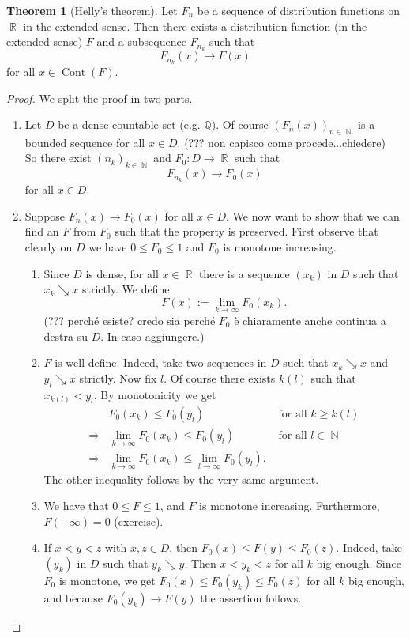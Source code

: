 \documentclass[12pt,a4paper]{report}
\theoremstyle{definition}
\newtheorem{theorem}{Theorem}[chapter] %
\theoremstyle{num.custom-title}
\DeclareMathOperator{\N}{\mathbb{N}}
\DeclareMathOperator{\R}{\mathbb{R}}
\DeclareMathOperator{\imp}{\Rightarrow}
\DeclareMathOperator{\Cont}{Cont}
\newcommand{\Q}{\mathbb{Q}}
\renewcommand{\1}{\mathbbm{1}}
\begin{document}
\begin{theorem}[Helly's theorem]
Let $F_n$ be a sequence of distribution functions on $\R$ in the extended sense. Then there exists a distribution function (in the extended sense) $F$ and a subsequence $F_{n_k}$ such that
\[
F_{n_k}(x) \to F(x)
\]
for all $x \in \Cont(F)$.
\begin{proof}
We split the proof in two parts.
\begin{enumerate}
\item Let $D$ be a dense countable set (e.g. $\Q$). Of course $(F_n(x))_{n \in \N}$ is a bounded sequence for all $x \in D$. (??? non capisco come procede...chiedere)\\
So there exist $(n_k)_{k \in \N}$ and $F_0 \colon D \to \R$ such that
\[
F_{n_k}(x) \to F_0(x)
\]
for all $x \in D$.
\item Suppose $F_n(x) \to F_0(x)$ for all $x \in D$. We now want to show that we can find an $F$ from $F_0$ such that the property is preserved. First observe that clearly on $D$ we have $0 \leq F_0 \leq 1$ and $F_0$ is monotone increasing.
\begin{enumerate}
\item Since $D$ is dense, for all $x \in \R$ there is a sequence $(x_k)$ in $D$ such that $x_k \searrow x$ strictly. We define
\[
F(x) := \lim_{k \to \infty} F_0(x_k).
\]
(??? perché esiste? credo sia perché $F_0$ è chiaramente anche continua a destra su $D$. In caso aggiungere.)
\item $F$ is well define. Indeed, take two sequences in $D$ such that $x_k \searrow x$ and $y_l \searrow x$ strictly. Now fix $l$. Of course there exists $k(l)$ such that $x_{k(l)} < y_l$. By monotonicity we get
\begin{align*}
& F_0(x_k) \leq F_0(y_l) & \text{ for all } k \geq k(l)\\
\imp & \lim_{k \to \infty} F_0(x_k) \leq F_0(y_l) & \text{ for all } l \in \N \\
\imp & \lim_{k \to \infty} F_0(x_k) \leq \lim_{l \to \infty} F_0(y_l).
\end{align*}
The other inequality follows by the very same argument.
\item We have that $0 \leq F \leq 1$, and $F$ is monotone increasing. Furthermore, $F(-\infty)=0$ (exercise).
\item If $x<y<z$ with $x,z \in D$, then $F_0(x) \leq F(y) \leq F_0(z)$. Indeed, take $(y_k)$ in $D$ such that $y_k \searrow y$. Then $x < y_k < z$ for all $k$ big enough. Since $F_0$ is monotone, we get $F_0(x) \leq F_0(y_k) \leq F_0(z)$ for all $k$ big enough, and because $F_0(y_k) \to F(y)$ the assertion follows.

\end{enumerate}
\end{enumerate}
\end{proof}
\end{theorem}
\end{document}
